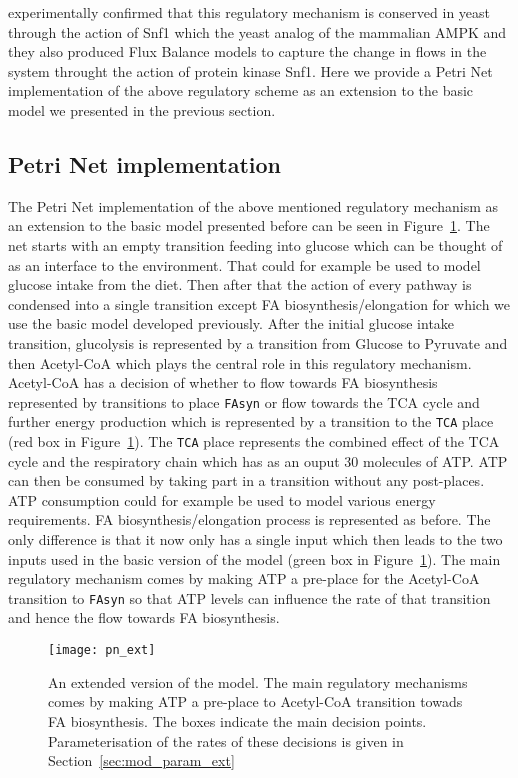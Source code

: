 \citet{nielsen2009systems} experimentally confirmed that
this regulatory mechanism is conserved in yeast through the action of
Snf1 which the yeast analog of the mammalian AMPK and they also
produced Flux Balance models to capture the
change in flows in the system throught the action of protein kinase
Snf1. Here we provide a Petri Net implementation of the above
regulatory scheme as an extension to the basic model we presented
in the previous section.

\subsection{Petri Net implementation}
The Petri Net implementation of the above mentioned regulatory
mechanism as an extension to the basic model presented before can be
seen in Figure~\ref{fig:pn_ext}. The net starts with an empty
transition feeding into glucose which can be thought of as an
interface to the environment. That could for example be used to model
glucose intake from the diet. Then after that the action of every pathway
is condensed into a single transition except FA
biosynthesis/elongation for which we use the basic model developed
previously. After the initial glucose intake transition, glucolysis is
represented by a transition from Glucose to Pyruvate and then
Acetyl-CoA which plays the central role in this regulatory
mechanism. Acetyl-CoA has a decision of whether to flow towards FA
biosynthesis represented by transitions to place \texttt{FAsyn}
or flow towards the TCA cycle and further energy production which is
represented by a transition to the \texttt{TCA}
place (red box in Figure~\ref{fig:pn_ext}). The \texttt{TCA}  place represents the combined
effect of the TCA cycle and the respiratory chain which has as an
ouput 30 molecules of ATP. ATP can then be consumed by taking part in
a transition without any post-places. ATP consumption could for
example be used to model various energy requirements. FA biosynthesis/elongation
process is represented as before. The only difference
is that it now only has a single input which then leads to the two
inputs used in the basic version of the model (green box in Figure~\ref{fig:pn_ext}).
The main regulatory mechanism comes by making ATP a pre-place for the
Acetyl-CoA transition to \texttt{FAsyn} so that ATP levels can
influence the rate of that transition and hence the flow towards FA
biosynthesis.

\begin{figure}[htbp!]
\centering
\texttt{[image: pn\_ext]}
\caption[Extended Petri Net model]{An extended version of the
  model. The main regulatory mechanisms comes by making ATP a
  pre-place to Acetyl-CoA transition towads FA biosynthesis. The boxes
indicate the main decision points. Parameterisation of the rates of
these decisions is given in Section~\ref{sec:mod_param_ext}}
\label{fig:pn_ext}
\end{figure}


